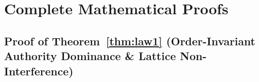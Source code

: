 
\section{Complete Mathematical Proofs}
\label{app:proofs}

\subsection{Proof of Theorem~\ref{thm:law1} (Order-Invariant Authority Dominance \& Lattice Non-Interference)}
\label{app:proof1}

